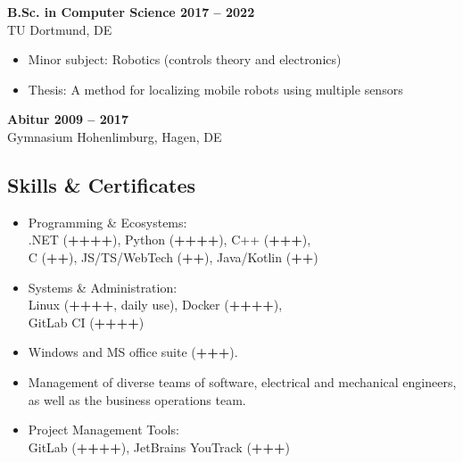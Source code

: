\documentclass[a4paper,11pt]{article}
\newcommand{\subsectionskip}[0]{\vspace{0.125cm}}
\newcommand{\col}[2]{\textcolor[HTML]{#1}{#2}}
\begin{document}
\begin{minipage}[t]{0.65\textwidth}
    \subsectionskip

    \col{81879c}{\textbf{B.Sc. in Computer Science \hfill 2017 -- 2022}} \\
    TU Dortmund, DE
    \begin{itemize}
        \small
        \item Minor subject: Robotics (controls theory and electronics)
        \item Thesis: A method for localizing mobile robots using multiple sensors
    \end{itemize}

    \subsectionskip

    \col{81879c}{\textbf{Abitur \hfill 2009 -- 2017}} \\
    Gymnasium Hohenlimburg, Hagen, DE

    \vspace{-0.5cm} %

    \begin{minipage}[t]{0.625\textwidth}
        \col{7690bb}{\section*{Skills \& Certificates}}
        \begin{itemize}
            \small
            \item Programming \& Ecosystems:\\
            .NET (\textbf{++++}), Python (\textbf{++++}), C++ (\textbf{+++}),\\
            C (\textbf{++}), JS/TS/WebTech (\textbf{++}), Java/Kotlin (\textbf{++})

            \item Systems \& Administration:\\
            Linux (\textbf{++++}, daily use), Docker (\textbf{++++}),\\
            GitLab CI (\textbf{++++})

            \item Windows and MS office suite (\textbf{+++}).

            \item Management of diverse teams of software, electrical and mechanical engineers, as well as the business operations team.

            \item Project Management Tools:\\
            GitLab (\textbf{++++}), JetBrains YouTrack (\textbf{+++})


\end{itemize}
\end{minipage}
\end{minipage}
\end{document}
